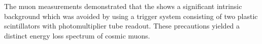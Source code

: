 The muon measurements demonstrated that the \pwo{} shows a significant intrinsic background which was avoided by using a trigger system consisting of two plastic scintillators with photomultiplier tube readout. These precautions yielded a distinct energy loss spectrum of cosmic muons. 










 
